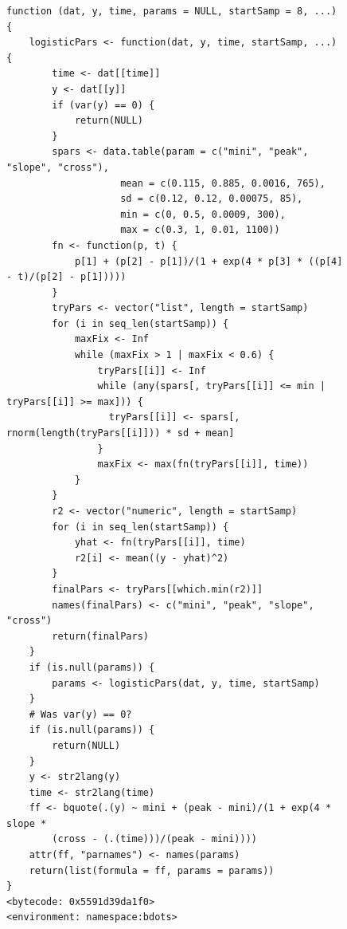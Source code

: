 \begin{singlespace}
\begin{figure}[H]
\centering
\begin{BVerbatim}
function (dat, y, time, params = NULL, startSamp = 8, ...) {
    logisticPars <- function(dat, y, time, startSamp, ...) {
        time <- dat[[time]]
        y <- dat[[y]]
        if (var(y) == 0) {
            return(NULL)
        }
        spars <- data.table(param = c("mini", "peak", "slope", "cross"), 
                    mean = c(0.115, 0.885, 0.0016, 765), 
                    sd = c(0.12, 0.12, 0.00075, 85), 
                    min = c(0, 0.5, 0.0009, 300), 
                    max = c(0.3, 1, 0.01, 1100))
        fn <- function(p, t) {
            p[1] + (p[2] - p[1])/(1 + exp(4 * p[3] * ((p[4] - t)/(p[2] - p[1]))))
        }
        tryPars <- vector("list", length = startSamp)
        for (i in seq_len(startSamp)) {
            maxFix <- Inf
            while (maxFix > 1 | maxFix < 0.6) {
                tryPars[[i]] <- Inf
                while (any(spars[, tryPars[[i]] <= min | tryPars[[i]] >= max])) {
                  tryPars[[i]] <- spars[, rnorm(length(tryPars[[i]])) * sd + mean]
                }
                maxFix <- max(fn(tryPars[[i]], time))
            }
        }
        r2 <- vector("numeric", length = startSamp)
        for (i in seq_len(startSamp)) {
            yhat <- fn(tryPars[[i]], time)
            r2[i] <- mean((y - yhat)^2)
        }
        finalPars <- tryPars[[which.min(r2)]]
        names(finalPars) <- c("mini", "peak", "slope", "cross")
        return(finalPars)
    }
    if (is.null(params)) {
        params <- logisticPars(dat, y, time, startSamp)
    }
    # Was var(y) == 0?
    if (is.null(params)) {
        return(NULL)
    }
    y <- str2lang(y)
    time <- str2lang(time)
    ff <- bquote(.(y) ~ mini + (peak - mini)/(1 + exp(4 * slope * 
        (cross - (.(time)))/(peak - mini))))
    attr(ff, "parnames") <- names(params)
    return(list(formula = ff, params = params))
}
<bytecode: 0x5591d39da1f0>
<environment: namespace:bdots>
\end{BVerbatim}
\end{figure}
\end{singlespace}







